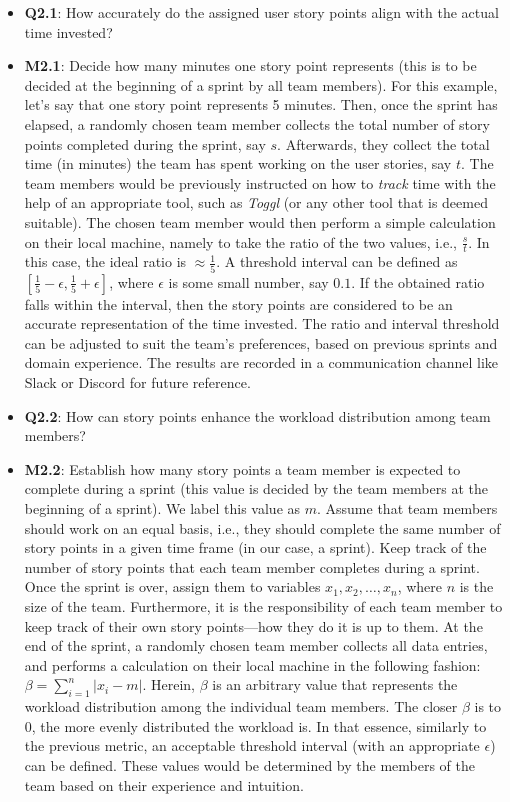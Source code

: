 \documentclass[conference]{IEEEtran}
\begin{document}
\begin{itemize}
  \item \textbf{Q2.1}: How accurately do the assigned user story points align
    with the actual time invested?
  \item \textbf{M2.1}:
    Decide how many minutes one story point represents (this is to be decided
    at the beginning of a sprint by all team members). For this example, let's
    say that one story point represents 5 minutes. Then, once the sprint has
    elapsed, a randomly chosen team member collects the total number of story
    points completed during the sprint, say $s$. Afterwards, they collect the
    total time (in minutes) the team has spent working on the user stories, say
    $t$. The team members would be previously instructed on how to
    \textit{track} time with the help of an appropriate tool, such as
    \textit{Toggl} (or any other tool that is deemed suitable). The chosen team
    member would then perform a simple calculation on their local machine,
    namely to take the ratio of the two values, i.e., $\frac{s}{t}$. In this
    case, the ideal ratio is $\approx \frac{1}{5}$. A threshold interval can be
    defined as $[\frac{1}{5} - \epsilon, \frac{1}{5} + \epsilon]$, where
    $\epsilon$ is some small number, say $0.1$. If the obtained ratio falls
    within the interval, then the story points are considered to be an accurate
    representation of the time invested. The ratio and interval threshold can
    be adjusted to suit the team's preferences, based on previous sprints and
    domain experience. The results are recorded in a communication channel like
    Slack or Discord for future reference. 
  \item \textbf{Q2.2}: How can story points enhance the workload distribution
    among team members?
  \item \textbf{M2.2}: 
    Establish how many story points a team member is expected to complete
    during a sprint (this value is decided by the team members at the beginning
    of a sprint). We label this value as $m$. Assume that team members should
    work on an equal basis, i.e., they should complete the same number of story
    points in a given time frame (in our case, a sprint). Keep track of the
    number of story points that each team member completes during a sprint.
    Once the sprint is over, assign them to variables $x_1, x_2, \dots, x_n$,
    where $n$ is the size of the team. Furthermore, it is the responsibility of
    each team member to keep track of their own story points---how they do it
    is up to them. At the end of the sprint, a randomly chosen team member
    collects all data entries, and performs a calculation on their local
    machine in the following fashion: $\beta = \sum_{i=1}^{n} |x_i - m|$.
    Herein, $\beta$ is an arbitrary value that represents the workload
    distribution among the individual team members. The closer $\beta$ is to
    $0$, the more evenly distributed the workload is. In that essence,
    similarly to the previous metric, an acceptable threshold interval (with an
    appropriate $\epsilon$) can be defined. These values would be determined by
    the members of the team based on their experience and intuition.
\end{itemize}
\end{document}
